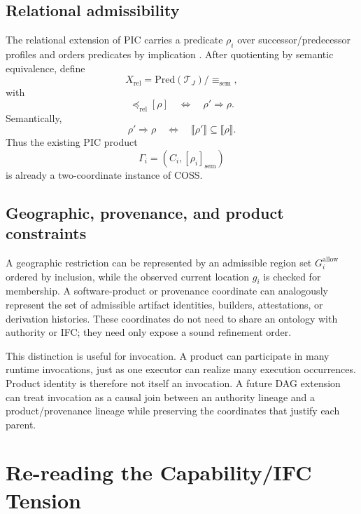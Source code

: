 \documentclass[10pt,twocolumn]{article}
\newcommand{\Model}{\textnormal{\textsc{COSS}}\xspace}
\newcommand{\sem}[1]{\llbracket #1 \rrbracket}
\begin{document}
\subsection{Relational admissibility}

The relational extension of PIC carries a predicate $\rho_i$ over
successor/predecessor profiles and orders predicates by implication
\cite{gallo_relational2026}.  After quotienting by semantic equivalence, define
\begin{equation}
  X_{\mathrm{rel}}
  =\mathrm{Pred}(\mathcal{T}_J)/{\equiv_{\mathrm{sem}}},
\end{equation}
with
\begin{equation}
  [\rho']\preceq_{\mathrm{rel}}[\rho]
  \quad\Longleftrightarrow\quad
  \rho'\Rightarrow\rho.
\end{equation}
Semantically,
\begin{equation}
  \rho'\Rightarrow\rho
  \quad\Longleftrightarrow\quad
  \sem{\rho'}\subseteq\sem{\rho}.
\end{equation}
Thus the existing PIC product
\begin{equation}
  \Gamma_i=(C_i,[\rho_i]_{\mathrm{sem}})
\end{equation}
is already a two-coordinate instance of \Model.

\subsection{Geographic, provenance, and product constraints}

A geographic restriction can be represented by an admissible region set
$G_i^{\mathrm{allow}}$ ordered by inclusion, while the observed current
location $g_i$ is checked for membership.  A software-product or provenance
coordinate can analogously represent the set of admissible artifact identities,
builders, attestations, or derivation histories.  These coordinates do not need
to share an ontology with authority or IFC; they need only expose a sound
refinement order.

This distinction is useful for invocation.  A product can participate in many
runtime invocations, just as one executor can realize many execution
occurrences.  Product identity is therefore not itself an invocation.  A future
DAG extension can treat invocation as a causal join between an authority
lineage and a product/provenance lineage while preserving the coordinates that
justify each parent.


\section{Re-reading the Capability/IFC Tension}
\end{document}
